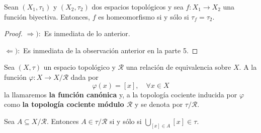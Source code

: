\documentclass[12pt]{report}
\theoremstyle{largebreak}
\newcommand\cf[3]{\ensuremath{#1:#2\rightarrow#3}}
\begin{document}
    \begin{cor}
        Sean $(X_1,\tau_1)$ y $(X_2,\tau_2)$ dos espacios topológicos y sea $\cf{f}{X_1}{X_2}$ una función biyectiva. Entonces, $f$ es homeomorfismo si y sólo si $\tau_f=\tau_2$.
    \end{cor}

    \begin{proof}
        $\Rightarrow):$ Es inmediata de lo anterior.

        $\Leftarrow):$ Es inmediata de la observación anterior en la parte 5.
    \end{proof}

    \begin{mydef}
        Sea $(X,\tau)$ un espacio topológico y $\mathcal{R}$ una relación de equivalencia sobre $X$. A la función $\cf{\varphi}{X}{X/\mathcal{R}}$ dada por
        \begin{equation*}
            \varphi(x)=[x],\quad\forall x\in X
        \end{equation*}
        la llamaremos \textbf{la función canónica} y, a la topología cociente inducida por $\varphi$ como \textbf{la topología cociente módulo $\mathcal{R}$} y se denota por $\tau/\mathcal{R}$.
    \end{mydef}

    \begin{obs}
        Sea $A\subseteq X/\mathcal{R}$. Entonces $A\in\tau/\mathcal{R}$ si y sólo si $\bigcup_{ [x]\in A}[x]\in\tau$.
    \end{obs}
\end{document}
